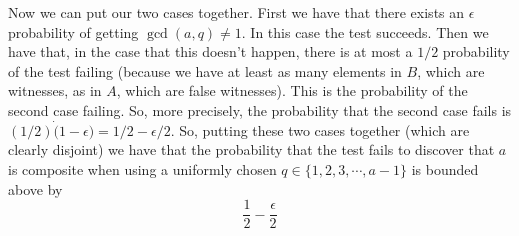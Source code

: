 \documentclass{article}
\begin{document}
Now we can put our two cases together. First we have that there exists
an $\epsilon$ probability of getting $\gcd(a,q) \neq 1$. In this case the
test succeeds. Then we have that, in the case that this doesn't happen, there
is at most a $1/2$ probability of the test failing (because we have at least
as many elements in $B$, which are witnesses, as in $A$, which are false witnesses).
This is the probability of the second case failing. So, more precisely, the
probability that the
second case fails is $(1/2) \dot (1 - \epsilon) = 1/2 - \epsilon/2$.
So, putting these two cases together (which are clearly disjoint) we have
that the probability that the test fails to discover that $a$ is composite
when using a uniformly chosen $q \in \{1,2,3,\cdots,a-1\}$ is bounded above by
\[ \frac{1}{2} - \frac{\epsilon}{2} \]
\end{document}

